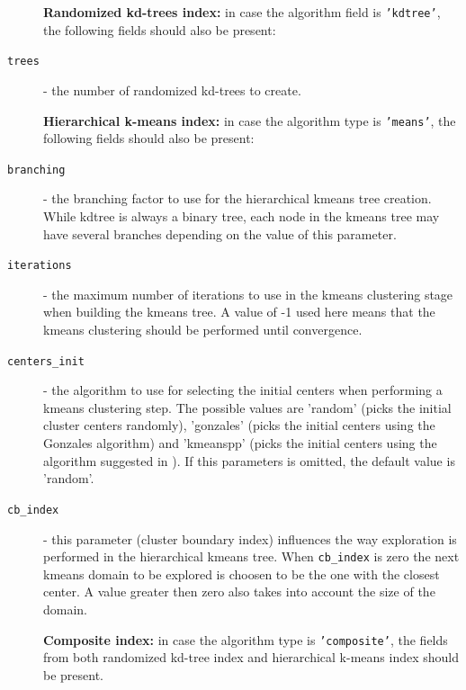 \documentclass[letter,10pt]{article}
\begin{document}
\begin{description}
\vspace{0.5cm}
\hspace{-1cm} \textbf{Randomized kd-trees index:} in case the algorithm field is \texttt{'kdtree'}, the following fields
should also be present:

\item[\texttt{trees}] - the number of randomized kd-trees to create.

\vspace{0.5cm}
\hspace{-1cm} \textbf{Hierarchical k-means index:} in case the algorithm type is \texttt{'means'}, the following fields
should also be present:


\item[\texttt{branching}] - the branching factor to use for
the hierarchical kmeans tree creation. While kdtree is always a binary
tree, each node in the kmeans tree may have several branches depending on
the value of this parameter. 

\item[\texttt{iterations}] - the maximum number of iterations to
use in the kmeans clustering stage when building the kmeans tree. A value
of -1 used here means that the kmeans clustering should be performed until
convergence.

\item[\texttt{centers\_init}] - the algorithm to use for selecting the initial
centers when performing a kmeans clustering step. The possible values are
'random' (picks the initial cluster centers randomly), 'gonzales' (picks the
initial centers using the Gonzales algorithm) and 'kmeanspp' (picks the initial
centers using the algorithm suggested in \cite{arthur_kmeanspp_2007}). If this
parameters is omitted, the default value is 'random'.

\item[\texttt{cb\_index}] - this parameter (cluster boundary index) influences the
way exploration is performed in the hierarchical kmeans tree. When \texttt{cb\_index} is zero
the next kmeans domain to be explored is choosen to be the one with the closest center. 
A value greater then zero also takes into account the size of the domain.

\vspace{0.5cm}
\hspace{-1cm} \textbf{Composite index:} in case the algorithm type is \texttt{'composite'}, the fields from 
both randomized kd-tree index and hierarchical k-means index should be present.

\end{description}
\end{document}
